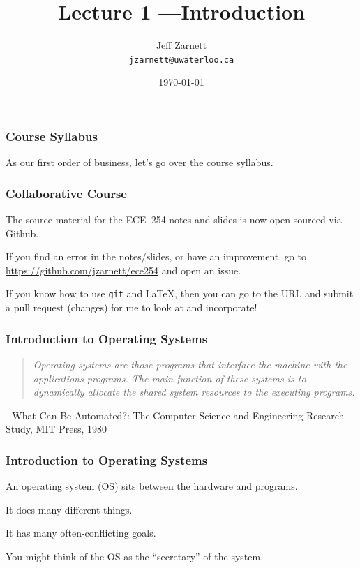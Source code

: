 

\title{Lecture 1 ---Introduction}

\author{Jeff Zarnett \\ \small \texttt{jzarnett@uwaterloo.ca}}
\date{\today}




\begin{frame}
  \titlepage

 \end{frame}

\begin{frame}
\frametitle{Course Syllabus}

As our first order of business, let's go over the course syllabus.

\end{frame}

\begin{frame}
\frametitle{Collaborative Course}

The source material for the ECE~254 notes and slides is now open-sourced via Github. 

If you find an error in the notes/slides, or have an improvement, go to \url{https://github.com/jzarnett/ece254} and open an issue. 

If you know how to use \texttt{git} and \LaTeX, then you can go to the URL and submit a pull request (changes) for me to look at and incorporate!


\end{frame}

\begin{frame}
\frametitle{Introduction to Operating Systems}

\begin{quote}
\textit{Operating systems are those programs that interface the machine with the applications programs. The main function of these systems is to dynamically allocate the shared system resources to the executing programs.}
\end{quote}

\hfill - What Can Be Automated?: The Computer Science and Engineering Research Study, MIT Press, 1980

\end{frame}

\begin{frame}
\frametitle{Introduction to Operating Systems}

An operating system (OS) sits between the hardware and programs.

It does many different things.

It has many often-conflicting goals.

You might think of the OS as the ``secretary'' of the system.

\end{frame}

